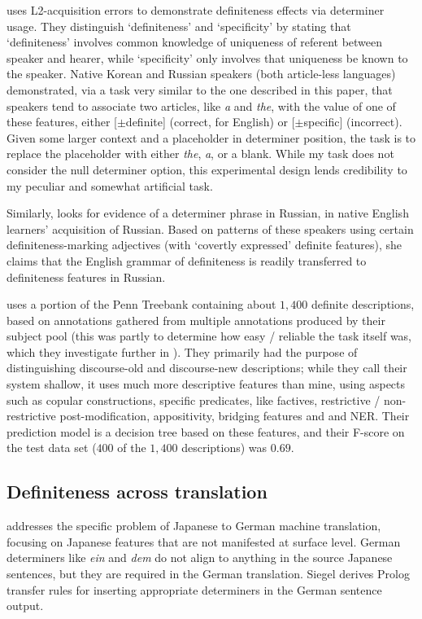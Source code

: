 \documentclass[11pt]{article}\usepackage{graphicx, color}
\begin{document}
\citet{ko:2009} uses L2-acquisition errors to demonstrate definiteness effects via determiner usage. They distinguish `definiteness' and `specificity' by stating that `definiteness' involves common knowledge of uniqueness of referent between speaker and hearer, while `specificity' only involves that uniqueness be known to the speaker. Native Korean and Russian speakers (both article-less languages) demonstrated, via a task very similar to the one described in this paper, that speakers tend to associate two articles, like \emph{a} and \emph{the}, with the value of one of these features, either [$\pm$definite] (correct, for English) or [$\pm$specific] (incorrect). Given some larger context and a placeholder in determiner position, the task is to replace the placeholder with either \emph{the}, \emph{a}, or a blank. While my task does not consider the null determiner option, this experimental design lends credibility to my peculiar and somewhat artificial task.

Similarly, \citet{cho:2011} looks for evidence of a determiner phrase in Russian, in native English learners' acquisition of Russian. Based on patterns of these speakers using certain definiteness-marking adjectives (with `covertly expressed' definite features), she claims that the English grammar of definiteness is readily transferred to definiteness features in Russian.

\citet{vieira:2000} uses a portion of the Penn Treebank containing about $1,400$ definite descriptions, based on annotations gathered from multiple annotations produced by their subject pool (this was partly to determine how easy / reliable the task itself was, which they investigate further in \citet{poesio:1998}). They primarily had the purpose of distinguishing discourse-old and discourse-new descriptions; while they call their system shallow, it uses much more descriptive features than mine, using aspects such as copular constructions, specific predicates, like factives, restrictive / non-restrictive post-modification, appositivity, bridging features and and NER. Their prediction model is a decision tree based on these features, and their F-score on the test data set ($400$ of the $1,400$ descriptions) was $0.69$.

\subsection{Definiteness across translation}

\citet{siegel:1996} addresses the specific problem of Japanese to German machine translation, focusing on Japanese features that are not manifested at surface level.
German determiners like \emph{ein} and \emph{dem} do not align to anything in the source Japanese sentences, but they are required in the German translation. Siegel derives Prolog transfer rules for inserting appropriate determiners in the German sentence output.
\end{document}
